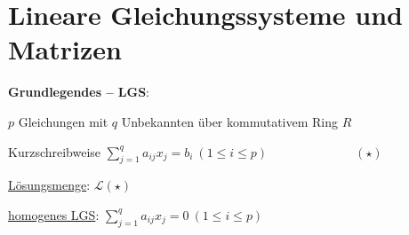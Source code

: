 \section{\label{sec:LGSMatrizen}Lineare Gleichungssysteme und Matrizen}

  \textbf{Grundlegendes -- LGS}:
  \begin{items}
    \item $p$ Gleichungen mit $q$ Unbekannten über kommutativem Ring $R$
    \item Kurzschreibweise $\sum_{j=1}^q a_{ij}x_j=b_i \ (1 \leq i \leq p) \qquad\qquad\qquad\quad (\star)$
    \item \underline{Lösungsmenge}: $\mathcal{L}(\star)$
    \item \underline{homogenes LGS}: $\sum_{j=1}^q a_{ij}x_j=0 \ (1 \leq i \leq p)$
  \end{items}

